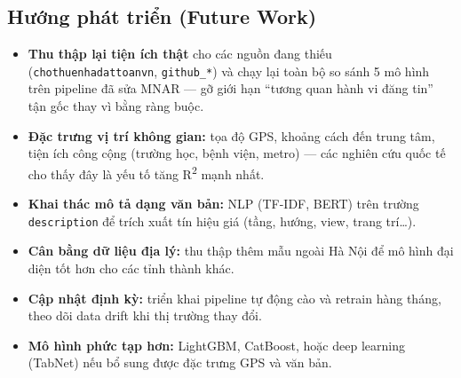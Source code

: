 \subsection{Hướng phát triển (Future Work)}

\begin{itemize}[leftmargin=*, itemsep=3pt]
  \item \textbf{Thu thập lại tiện ích thật} cho các nguồn đang thiếu
        (\texttt{chothuenhadattoanvn}, \texttt{github\_*}) và chạy lại toàn bộ
        so sánh 5 mô hình trên pipeline đã sửa MNAR — gỡ giới hạn
        ``tương quan hành vi đăng tin'' tận gốc thay vì bằng ràng buộc.
  \item \textbf{Đặc trưng vị trí không gian:} tọa độ GPS, khoảng cách đến trung tâm,
        tiện ích công cộng (trường học, bệnh viện, metro) — các nghiên cứu quốc tế
        cho thấy đây là yếu tố tăng R\textsuperscript{2} mạnh nhất.
  \item \textbf{Khai thác mô tả dạng văn bản:} NLP (TF-IDF, BERT) trên trường
        \texttt{description} để trích xuất tín hiệu giá (tầng, hướng, view, trang trí…).
  \item \textbf{Cân bằng dữ liệu địa lý:} thu thập thêm mẫu ngoài Hà Nội
        để mô hình đại diện tốt hơn cho các tỉnh thành khác.
  \item \textbf{Cập nhật định kỳ:} triển khai pipeline tự động cào và retrain
        hàng tháng, theo dõi data drift khi thị trường thay đổi.
  \item \textbf{Mô hình phức tạp hơn:} LightGBM, CatBoost, hoặc deep learning
        (TabNet) nếu bổ sung được đặc trưng GPS và văn bản.
\end{itemize}

